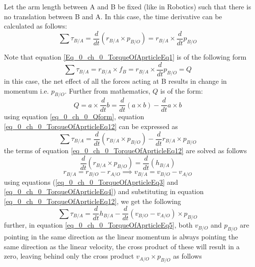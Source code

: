 Let the arm length between A and B be fixed (like in Robotics) such that there is no translation between B and A. In this case, the time derivative can be calculated as follows:
\begin{equation} \label{Eq_0_ch_0_TorqueOfAprticleEq1}
	\sum \tau_{B/A} = \frac{d}{dt} (r_{B/A} \times p_{B/O}) = r_{B/A} \times \frac{d}{dt} p_{B/O}
\end{equation}

Note that equation \eqref{Eq_0_ch_0_TorqueOfAprticleEq1} is of the following form
\begin{equation}\label{eq_0_ch_0_TorqueOfAprticleEq12}
	\sum \tau_{B/A} = r_{B/A} \times f_{B} = r_{B/A} \times \frac{d}{dt} p_{B/O} = Q
\end{equation}
in this case, the net effect of all the forces acting at B results in change in momentum i.e. $p_{B/O}$. Further from mathematics, $Q$ is of the form:
\begin{equation}\label{eq_0_ch_0_Qform}
	Q = a \times \frac{d}{dt}b = \frac{d}{dt}(a \times b) - \frac{d}{dt}a \times b
\end{equation}
using equation \eqref{eq_0_ch_0_Qform}, equation \eqref{eq_0_ch_0_TorqueOfAprticleEq12} can be expressed as
\begin{equation}\label{eq_0_ch_0_TorqueOfAprticleEq13}
	\sum \tau_{B/A} = \frac{d}{dt}(r_{B/A} \times p_{B/O}) - \frac{d}{dt}r_{B/A} \times p_{B/O}
\end{equation}
the terms of equation \eqref{eq_0_ch_0_TorqueOfAprticleEq12} are solved as follows
\begin{equation} \label{eq_0_ch_0_TorqueOfAprticleEq3}
	\frac{d}{dt}(r_{B/A} \times p_{B/O}) = \frac{d}{dt}(h_{B/A})
\end{equation}
\begin{equation}\label{eq_0_ch_0_TorqueOfAprticleEq4}
	r_{B/A} = r_{B/O} - r_{A/O} \implies v_{B/A} = v_{B/O} - v_{A/O}
\end{equation}
using equations (\eqref{eq_0_ch_0_TorqueOfAprticleEq3} and \eqref{eq_0_ch_0_TorqueOfAprticleEq4}) and substituting in equation \eqref{eq_0_ch_0_TorqueOfAprticleEq12}, we get the following
\begin{equation} \label{eq_0_ch_0_TorqueOfAprticleEq5}
	\sum \tau_{B/A} = \frac{d}{dt} h_{B/A} - \frac{d}{dt} (v_{B/O} - v_{A/O}) \times p_{B/O}
\end{equation}
further, in equation \eqref{eq_0_ch_0_TorqueOfAprticleEq5}, both $v_{B/O}$ and $p_{B/O}$ are pointing in the same direction as the linear momentum is always pointing the same direction as the linear velocity, the cross product of these will result in a zero, leaving behind only the cross product $v_{A/O} \times p_{B/O}$ as follows
